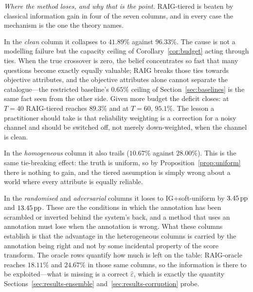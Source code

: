 \emph{Where the method loses, and why that is the point.} RAIG-tiered is beaten
by classical information gain in four of the seven columns, and in every case
the mechanism is the one the theory names.

In the \emph{clean} column it collapses to $41.89\%$ against $96.33\%$. The
cause is not a modelling failure but the capacity ceiling of
Corollary~\ref{cor:budget} acting through ties. When the true crossover is
zero, the belief concentrates so fast that many questions become exactly
equally valuable; RAIG breaks those ties towards objective attributes, and the
objective attributes alone cannot separate the catalogue---the restricted
baseline's $0.65\%$ ceiling of Section~\ref{sec:baselines} is the same fact
seen from the other side. Given more budget the deficit closes: at $T=40$
RAIG-tiered reaches $89.3\%$ and at $T=60$, $95.1\%$. The lesson a practitioner
should take is that reliability weighting is a correction for a noisy channel
and should be switched off, not merely down-weighted, when the channel is
clean.

In the \emph{homogeneous} column it also trails ($10.67\%$ against $28.00\%$).
This is the same tie-breaking effect: the truth is uniform, so by
Proposition~\ref{prop:uniform} there is nothing to gain, and the tiered
assumption is simply wrong about a world where every attribute is equally
reliable.

In the \emph{randomised} and \emph{adversarial} columns it loses to
IG+soft-uniform by $3.45\,\text{pp}$ and $13.45\,\text{pp}$. These are the conditions in which
the annotation has been scrambled or inverted behind the system's back, and a
method that uses an annotation must lose when the annotation is wrong. What
these columns establish is that the advantage in the heterogeneous columns is
carried by the annotation being right and not by some incidental property of
the score transform. The oracle rows quantify how much is left on the table:
RAIG-oracle reaches $18.11\%$ and $24.67\%$ in those same columns, so the
information is there to be exploited---what is missing is a correct
$\hat\varepsilon$, which is exactly the quantity
Sections~\ref{sec:results-ensemble} and~\ref{sec:results-corruption} probe.

